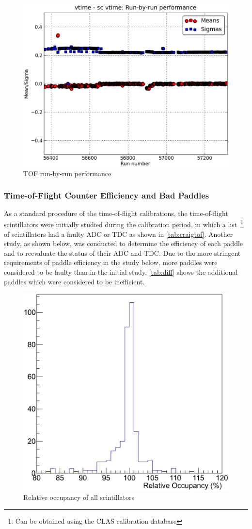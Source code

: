 \begin{figure}\begin{center}
    \includegraphics[width=.40\linewidth]{figures/calib/tof/Tof_runscan_p0v7.eps}
    \caption{TOF run-by-run performance}
    \label{plt:tofrunbyrun}
\end{center}\end{figure}

\subsubsection{\label{sec:calib.tof.eff}Time-of-Flight Counter Efficiency and Bad Paddles}

As a standard procedure of the time-of-flight calibrations, the time-of-flight scintillators were initially studied during the calibration period, in which a list~\footnote{Can be obtained using the CLAS calibration database} of scintillators had a faulty ADC or TDC as shown in \ref{tab:craigtof}. Another study, as shown below, was conducted to determine the efficiency of each paddle and to reevaluate the status of their ADC and TDC. Due to the more stringent requirements of paddle efficiency in the study below, more paddles were considered to be faulty than in the initial study. \ref{tab:diff} shows the additional paddles which were considered to be inefficient.


\begin{figure}\begin{center}
    \includegraphics[trim=0 40 10 40,clip,width=.40\linewidth]{figures/calib/tof/tofko/occp.eps}
    \caption{Relative occupancy of all scintillators}
    \label{plt:occp}
\end{center}\end{figure}


